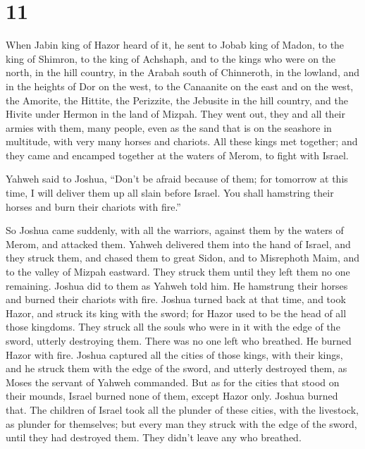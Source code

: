 \hypertarget{section-10}{%
\section{11}\label{section-10}}

 When Jabin king of Hazor heard of it, he sent to Jobab
king of Madon, to the king of Shimron, to the king of Achshaph,
 and to the kings who were on the north, in the hill
country, in the Arabah south of Chinneroth, in the lowland, and in the
heights of Dor on the west,  to the Canaanite on the east
and on the west, the Amorite, the Hittite, the Perizzite, the Jebusite
in the hill country, and the Hivite under Hermon in the land of Mizpah.
 They went out, they and all their armies with them, many
people, even as the sand that is on the seashore in multitude, with very
many horses and chariots.  All these kings met together;
and they came and encamped together at the waters of Merom, to fight
with Israel.

 Yahweh said to Joshua, ``Don't be afraid because of them;
for tomorrow at this time, I will deliver them up all slain before
Israel. You shall hamstring their horses and burn their chariots with
fire.''

 So Joshua came suddenly, with all the warriors, against
them by the waters of Merom, and attacked them.  Yahweh
delivered them into the hand of Israel, and they struck them, and chased
them to great Sidon, and to Misrephoth Maim, and to the valley of Mizpah
eastward. They struck them until they left them no one remaining.
 Joshua did to them as Yahweh told him. He hamstrung their
horses and burned their chariots with fire.  Joshua
turned back at that time, and took Hazor, and struck its king with the
sword; for Hazor used to be the head of all those kingdoms.
 They struck all the souls who were in it with the edge
of the sword, utterly destroying them. There was no one left who
breathed. He burned Hazor with fire.  Joshua captured all
the cities of those kings, with their kings, and he struck them with the
edge of the sword, and utterly destroyed them, as Moses the servant of
Yahweh commanded.  But as for the cities that stood on
their mounds, Israel burned none of them, except Hazor only. Joshua
burned that.  The children of Israel took all the plunder
of these cities, with the livestock, as plunder for themselves; but
every man they struck with the edge of the sword, until they had
destroyed them. They didn't leave any who breathed.

